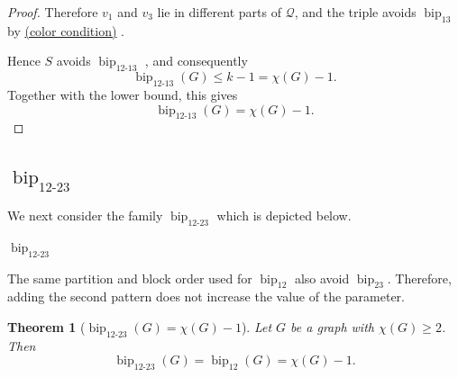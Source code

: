 \documentclass[12pt]{article}
\theoremstyle{plain}
\newtheorem{theorem}{Theorem}[section]
\theoremstyle{definition}
\theoremstyle{remark}
\theoremstyle{definition}
\newcommand{\colorcondition}{%
  \hyperref[def:avoid:cond:color]{(color condition)}\xspace
}
\newcommand{\biplabel}{\mathrm{bip}}
\DeclareRobustCommand{\bipparam}[1]{%
  \ensuremath{\mathop{\biplabel}\nolimits_{#1}}%
}
\begin{document}
\begin{proof}
Therefore \(v_1\) and \(v_3\) lie in different parts of \(\mathcal Q\), and the triple avoids
\(\bipparam{13}\) by \colorcondition.

Hence \(S\) avoids \bipparam{12\text{-}13}, and consequently
\[
\bipparam{12\text{-}13}(G)
\le
k-1
=
\chi(G)-1.
\]
Together with the lower bound, this gives
\[
\bipparam{12\text{-}13}(G)=\chi(G)-1.
\]

\end{proof}



\subsection{\texorpdfstring{\(\bipparam{12\text{-}23}\)}{bip12-23}}
\label{subsec:bip12-23}

We next consider the family \(\bipparam{12\text{-}23}\) which is depicted below.

\begin{center}

\smallskip
\(\bipparam{12\text{-}23}\)
\end{center}

The same partition and block order used for \(\bipparam{12}\) also avoid
\(\bipparam{23}\). Therefore, adding the second pattern does not increase
the value of the parameter.






\begin{theorem}[\(\bipparam{12\text{-}23}(G)=\chi(G)-1\)]
\label{thm:bip12-23-chi}
Let \(G\) be a graph with \(\chi(G)\ge 2\). Then
\[
\bipparam{12\text{-}23}(G)
=
\bipparam{12}(G)
=
\chi(G)-1.
\]
\end{theorem}
\end{document}
